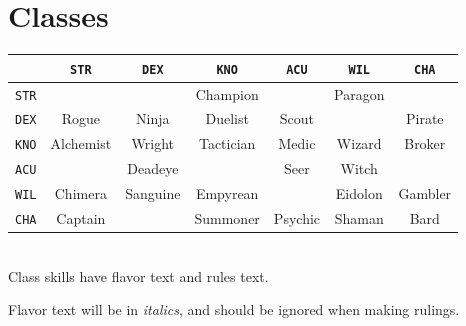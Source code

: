 \documentclass[12pt]{article}
\newcommand{\STR}{\texttt{STR}}
\newcommand{\DEX}{\texttt{DEX}}
\newcommand{\KNO}{\texttt{KNO}}
\newcommand{\ACU}{\texttt{ACU}}
\newcommand{\WIL}{\texttt{WIL}}
\newcommand{\CHA}{\texttt{CHA}}
\begin{document}
\pagebreak
\section{Classes}

\begin{tabularx}{\textwidth}{c|CCCCCC}
& \STR & \DEX & \KNO & \ACU & \WIL & \CHA \\\hline
\STR &  &  & Champion &  & Paragon &  \\
\DEX & Rogue & Ninja & Duelist & Scout & & Pirate \\
\KNO & Alchemist & Wright & Tactician & Medic & Wizard & Broker \\
\ACU & & Deadeye & & Seer & Witch &  \\
\WIL & Chimera & Sanguine & Empyrean & & Eidolon & Gambler \\
\CHA & Captain & & Summoner & Psychic & Shaman & Bard \\
\end{tabularx}
\\[5mm]
Class skills have flavor text and rules text.

Flavor text will be in \textit{italics}, and should be ignored when making rulings.
\end{document}
